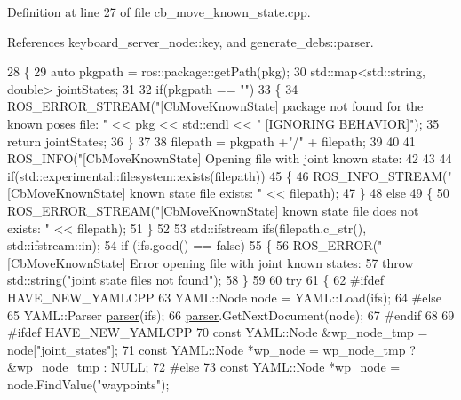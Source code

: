 Definition at line 27 of file cb\+\_\+move\+\_\+known\+\_\+state.\+cpp.



References keyboard\+\_\+server\+\_\+node\+::key, and generate\+\_\+debs\+::parser.


\begin{DoxyCode}
28 \{
29   \textcolor{keyword}{auto} pkgpath = ros::package::getPath(pkg);
30   std::map<std::string, double> jointStates;
31 
32   \textcolor{keywordflow}{if}(pkgpath == \textcolor{stringliteral}{""})
33   \{
34     ROS\_ERROR\_STREAM(\textcolor{stringliteral}{"[CbMoveKnownState] package not found for the known poses file: "} << pkg << std::endl 
      << \textcolor{stringliteral}{" [IGNORING BEHAVIOR]"});
35     \textcolor{keywordflow}{return} jointStates;
36   \}
37 
38   filepath =  pkgpath +\textcolor{stringliteral}{"/"} + filepath;
39   
40 
41   ROS\_INFO(\textcolor{stringliteral}{"[CbMoveKnownState] Opening file with joint known state: %
42 
43 
44   \textcolor{keywordflow}{if}(std::experimental::filesystem::exists(filepath))
45   \{
46     ROS\_INFO\_STREAM(\textcolor{stringliteral}{"[CbMoveKnownState] known state file exists: "} << filepath);
47   \}
48   \textcolor{keywordflow}{else}
49   \{
50     ROS\_ERROR\_STREAM(\textcolor{stringliteral}{"[CbMoveKnownState] known state file does not exists: "} << filepath);
51   \}
52 
53   std::ifstream ifs(filepath.c\_str(), std::ifstream::in);
54   \textcolor{keywordflow}{if} (ifs.good() == \textcolor{keyword}{false})
55   \{
56     ROS\_ERROR(\textcolor{stringliteral}{"[CbMoveKnownState] Error opening file with joint known states: %
57     \textcolor{keywordflow}{throw} std::string(\textcolor{stringliteral}{"joint state files not found"});
58   \}
59 
60   \textcolor{keywordflow}{try}
61   \{
62 \textcolor{preprocessor}{#ifdef HAVE\_NEW\_YAMLCPP}
63     YAML::Node node = YAML::Load(ifs);
64 \textcolor{preprocessor}{#else}
65     YAML::Parser \hyperlink{namespacegenerate__debs_a4a9ae4bb85fc62d7973ea3d09ced6c26}{parser}(ifs);
66     \hyperlink{namespacegenerate__debs_a4a9ae4bb85fc62d7973ea3d09ced6c26}{parser}.GetNextDocument(node);
67 \textcolor{preprocessor}{#endif}
68 
69 \textcolor{preprocessor}{#ifdef HAVE\_NEW\_YAMLCPP}
70     \textcolor{keyword}{const} YAML::Node &wp\_node\_tmp = node[\textcolor{stringliteral}{"joint\_states"}];
71     \textcolor{keyword}{const} YAML::Node *wp\_node = wp\_node\_tmp ? &wp\_node\_tmp : NULL;
72 \textcolor{preprocessor}{#else}
73     \textcolor{keyword}{const} YAML::Node *wp\_node = node.FindValue(\textcolor{stringliteral}{"waypoints"});
}}
\end{DoxyCode}
